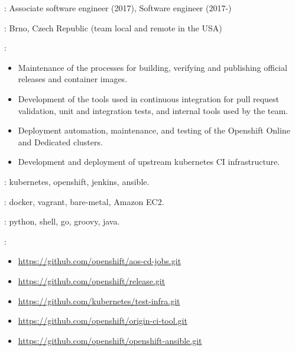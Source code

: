 \begin{description}[noitemsep]
    \item[Titles]:
        Associate software engineer (2017), Software engineer (2017-)
    \item[Location]: Brno, Czech Republic (team local and remote in the USA)
    \item[Attributions]:
        \begin{itemize}[noitemsep]
            \item
                Maintenance of the processes for building, verifying and
                publishing official releases and container images.
            \item
                Development of the tools used in continuous integration for
                pull request validation, unit and integration tests, and
                internal tools used by the team.
            \item
                Deployment automation, maintenance, and testing of the
                Openshift Online and Dedicated clusters.
            \item
                Development and deployment of upstream kubernetes CI
                infrastructure.
        \end{itemize}
    \item[Platform]: kubernetes, openshift, jenkins, ansible.
    \item[Infrastructure]: docker, vagrant, bare-metal, Amazon EC2.
    \item[CI jobs]: python, shell, go, groovy, java.
    \item[Public repositories]:
        \begin{itemize}[noitemsep]
            \item \url{https://github.com/openshift/aos-cd-jobs.git}
            \item \url{https://github.com/openshift/release.git}
            \item \url{https://github.com/kubernetes/test-infra.git}
            \item \url{https://github.com/openshift/origin-ci-tool.git}
            \item \url{https://github.com/openshift/openshift-ansible.git}
        \end{itemize}
\end{description}
